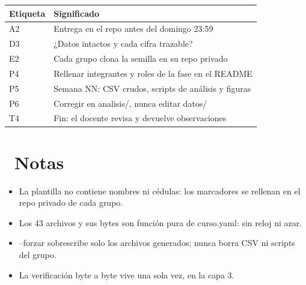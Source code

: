 \documentclass[11pt,a4paper]{article}
\newcommand{\iconotexto}[2]{\textcolor{cyanNeon}{\faIcon{#1}}~#2}
\begin{document}
\vspace{6pt}
\begin{tcolorbox}[cajaContenido, title={\faIcon{table}~Leyenda de etiquetas}]
\small
\begin{tabularx}{\linewidth}{@{}>{\centering\arraybackslash}p{1.4cm}X@{}}
\toprule
\textbf{Etiqueta} & \textbf{Significado} \\ \midrule
A2 & Entrega en el repo antes del domingo 23:59 \\
D3 & ¿Datos intactos y cada cifra trazable? \\
E2 & Cada grupo clona la semilla en su repo privado \\
P4 & Rellenar integrantes y roles de la fase en el README \\
P5 & Semana NN: CSV crudos, scripts de análisis y figuras \\
P6 & Corregir en analisis/, nunca editar datos/ \\
T4 & Fin: el docente revisa y devuelve observaciones \\
\bottomrule
\end{tabularx}
\end{tcolorbox}


\section{\iconotexto{sticky-note}{Notas}}
\begin{itemize}
\item La plantilla no contiene nombres ni cédulas: los marcadores se rellenan en el repo privado de cada grupo.
\item Los 43 archivos y sus bytes son función pura de curso.yaml: sin reloj ni azar.
\item --forzar sobrescribe solo los archivos generados; nunca borra CSV ni scripts del grupo.
\item La verificación byte a byte vive una sola vez, en la capa 3.
\end{itemize}

\end{document}
